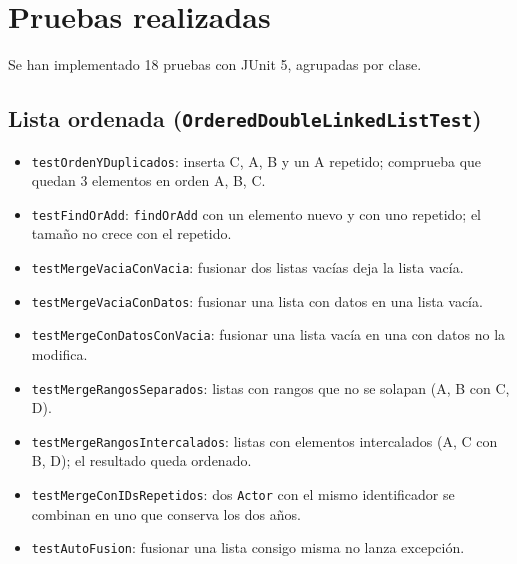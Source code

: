\documentclass[a4paper,11pt]{report}
\begin{document}
\section{Pruebas realizadas}
Se han implementado 18 pruebas con JUnit 5, agrupadas por clase.

\subsection*{Lista ordenada (\texttt{OrderedDoubleLinkedListTest})}
\begin{itemize}
\item \texttt{testOrdenYDuplicados}: inserta C, A, B y un A repetido; comprueba que quedan 3 elementos en orden A, B, C.
\item \texttt{testFindOrAdd}: \texttt{findOrAdd} con un elemento nuevo y con uno repetido; el tamaño no crece con el repetido.
\item \texttt{testMergeVaciaConVacia}: fusionar dos listas vacías deja la lista vacía.
\item \texttt{testMergeVaciaConDatos}: fusionar una lista con datos en una lista vacía.
\item \texttt{testMergeConDatosConVacia}: fusionar una lista vacía en una con datos no la modifica.
\item \texttt{testMergeRangosSeparados}: listas con rangos que no se solapan (A, B con C, D).
\item \texttt{testMergeRangosIntercalados}: listas con elementos intercalados (A, C con B, D); el resultado queda ordenado.
\item \texttt{testMergeConIDsRepetidos}: dos \texttt{Actor} con el mismo identificador se combinan en uno que conserva los dos años.
\item \texttt{testAutoFusion}: fusionar una lista consigo misma no lanza excepción.
\end{itemize}
\end{document}
